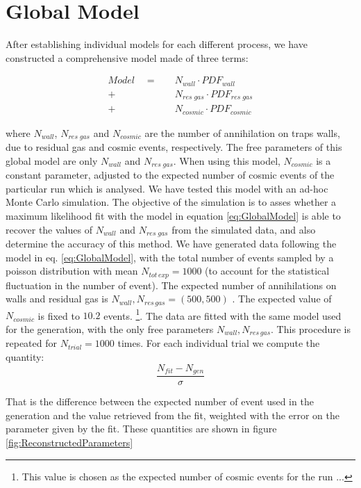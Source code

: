 \documentclass[11pt,a4paper,oneside]{article}
\begin{document}
\section*{Global Model}

After establishing individual models for each different process, we have constructed a comprehensive model made of three terms:

\begin{equation} \label{eq:GlobalModel}
\begin{split}
Model \quad = \quad &N_{wall} \cdot PDF_{wall} \\
	+ &N_{res \; gas} \cdot PDF_{res \; gas}\\ 
	+ &N_{cosmic} \cdot PDF_{cosmic}
\end{split} 
\end{equation} 

where $N_{wall}$, $N_ {res \; gas}$ and $N_{cosmic}$ are the number of annihilation on traps walls, due to residual gas and cosmic events, respectively.
The free parameters of this global model are only $N_{wall}$ and $N_{res \; gas}$. When using this model, $N_{cosmic}$ is a constant parameter, adjusted to the expected number of cosmic events of the particular run which is analysed.
We have tested this model with an ad-hoc Monte Carlo simulation. The objective of the simulation is to asses whether a maximum likelihood fit with the model in equation \ref{eq:GlobalModel} is able to recover the values of $N_{wall}$ and $N_{res \; gas}$ from the simulated data, and also determine the accuracy of this method. 
We have generated data following the model in eq. \ref{eq:GlobalModel}, with the total number of events sampled by a poisson distribution with mean $N_{tot \, exp} = 1000$ (to account for the statistical fluctuation in the number of event). The expected number of annihilations on walls and residual gas is $N_{wall} , N_{res \, gas} = (500,500)$ . The expected value of $N_{cosmic}$ is fixed to $10.2$ events. \footnote{ This value is chosen as the expected number of cosmic events for the run ...}.
The data are fitted with the same model used for the generation, with the only free parameters $N_{wall} , N_{res \, gas}$. This procedure is repeated for $N_{trial} = 1000$ times. For each individual trial we compute the quantity:
\begin{equation} \label{eq:ParmasReco}
\dfrac{N_{fit} - N_{gen}}{\sigma}
\end{equation}

That is the difference between the expected number of event used in the generation and the value retrieved from the fit, weighted with the error on the parameter given by the fit.  These quantities are shown in figure \ref{fig:ReconstructedParameters}
\end{document}
